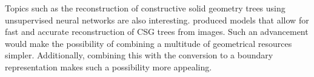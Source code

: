 \documentclass[a4paper,11pt,oneside]{article}
\begin{document}
Topics such as the reconstruction of constructive solid geometry trees using unsupervised neural networks are also interesting. \cite{ucsgnet_ml} produced models that allow for fast and accurate reconstruction of CSG trees from images. Such an advancement would make the possibility of combining a multitude of geometrical resources simpler. Additionally, combining this with the conversion to a boundary representation makes such a possibility more appealing.
  

\newpage
%
%
\printbibliography
\end{document}
